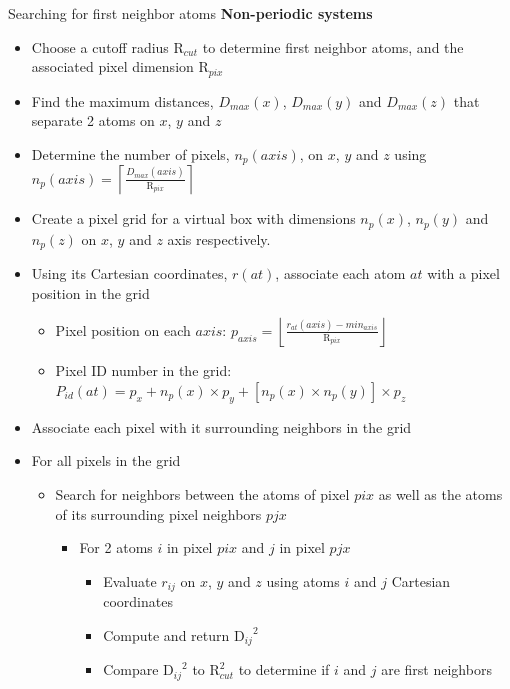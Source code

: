 \documentclass[9pt,tutorial]{livecoms}
\newcommand{\Rc}{\text{R}_{cut}}
\newcommand{\Pc}{\text{R}_{pix}}
\newcommand{\Dij}{{\text{D}_{ij}}}
\begin{document}
\begin{Checklists*}[h]

\begin{checklist}{Searching for first neighbor atoms}
\textbf{Non-periodic systems}
\begin{itemize}
\item Choose a cutoff radius $\Rc$ to determine first neighbor atoms, and the associated pixel dimension $\Pc$
\item Find the maximum distances, $D_{max}(x)$, $D_{max}(y)$ and $D_{max}(z)$ that separate 2 atoms on $x$, $y$ and $z$
\item Determine the number of pixels, $n_{p}(axis)$, on $x$, $y$ and $z$ using $n_{p}(axis) = \left\lceil \frac{D_{max}(axis)}{\Pc} \right\rceil$
\item Create a pixel grid for a virtual box with dimensions $n_{p}(x)$, $n_{p}(y)$ and $n_{p}(z)$ on $x$, $y$ and $z$ axis respectively.
\item Using its Cartesian coordinates, $r(at)$, associate each atom $at$ with a pixel position in the grid
\begin{itemize}
\item Pixel position on each $axis$: $p_{axis} = \left\lfloor \frac{r_{at}(axis) - min_{axis}}{\Pc} \right\rfloor$
\item Pixel ID number in the grid: $P_{id}(at) = p_{x} + n_{p}(x) \times p_{y} + \left[n_{p}(x) \times n_{p}(y)\right] \times p_{z}$
\end{itemize}
\item Associate each pixel with it surrounding neighbors in the grid
\item For all pixels in the grid
\begin{itemize}
\item Search for neighbors between the atoms of pixel $pix$ as well as the atoms of its surrounding pixel neighbors $pjx$
\begin{itemize}
\item For 2 atoms $i$ in pixel $pix$ and $j$ in pixel $pjx$
\begin{itemize}
\item Evaluate $r_{ij}$ on $x$, $y$ and $z$ using atoms $i$ and $j$ Cartesian coordinates
\item Compute and return $\Dij^2$ 
\item Compare $\Dij^2$ to $\Rc^2$ to determine if $i$ and $j$ are first neighbors
\end{itemize}
\end{itemize}

\end{itemize}
\end{itemize}
\end{checklist}
\end{Checklists*}
\end{document}
